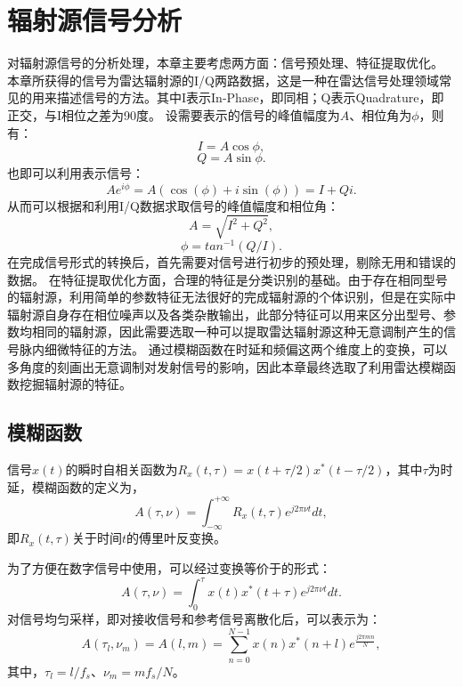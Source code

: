 \section{辐射源信号分析}
\label{sec:sei_data}
对辐射源信号的分析处理，本章主要考虑两方面：信号预处理、特征提取优化。
本章所获得的信号为雷达辐射源的I/Q两路数据，这是一种在雷达信号处理领域常见的用来描述信号的方法。其中I表示In-Phase，即同相；Q表示Quadrature，即正交，与I相位之差为90度。
设需要表示的信号的峰值幅度为$A$、相位角为$\phi$，则有：
\begin{equation}
	I = A\cos{\phi},
	\label{equ:i}
\end{equation}
\begin{equation}
	Q = A\sin{\phi}.
	\label{equ:q}
\end{equation}
也即可以利用表示信号：
\begin{equation}
	Ae^{i\phi}=A(\cos(\phi) + i\sin(\phi))=I+Qi.
	\label{equ:signal}
\end{equation}
从而可以根据和利用I/Q数据求取信号的峰值幅度和相位角：
\begin{equation}
	A=\sqrt{I^2+Q^2},
\end{equation}
\begin{equation}
	\phi=tan^{-1}(Q/I).
\end{equation}
在完成信号形式的转换后，首先需要对信号进行初步的预处理，剔除无用和错误的数据。
在特征提取优化方面，合理的特征是分类识别的基础。由于存在相同型号的辐射源，利用简单的参数特征无法很好的完成辐射源的个体识别，但是在实际中辐射源自身存在相位噪声以及各类杂散输出，此部分特征可以用来区分出型号、参数均相同的辐射源，因此需要选取一种可以提取雷达辐射源这种无意调制产生的信号脉内细微特征的方法。
通过模糊函数在时延和频偏这两个维度上的变换，可以多角度的刻画出无意调制对发射信号的影响，因此本章最终选取了利用雷达模糊函数挖掘辐射源的特征。
\subsection{模糊函数}
信号$x(t)$的瞬时自相关函数为$R_x(t,\tau)=x(t+\tau/2)x^{*}(t-\tau/2)$，其中$\tau$为时延，模糊函数的定义为，
\begin{equation}
A(\tau,\nu) = \int_{-\infty}^{+\infty}R_x(t,\tau)e^{j2\pi\nu t}dt,
\label{equ:defineaf}
\end{equation}
即$R_x(t,\tau)$关于时间$t$的傅里叶反变换。

为了方便在数字信号中使用，可以经过变换等价于的形式：
\begin{equation}
A(\tau,\nu) = \int_{0}^{\tau}x(t)x^{*}(t+\tau)e^{j2\pi\nu t}dt.
\label{equ:afcon}
\end{equation}
对信号均匀采样，即对接收信号和参考信号离散化后，可以表示为：
\begin{equation}
A(\tau_l,\nu_m) = A(l, m) = \sum_{n = 0}^{N-1}x(n)x^{*}(n+l)e^{\frac{j2\pi m n}{N}},
\end{equation}
其中，$\tau_l=l/f_s$、$\nu_m=mf_s/N$。

